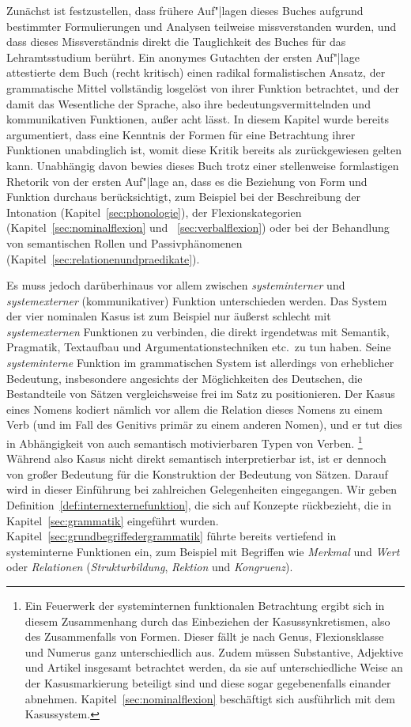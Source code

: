 Zunächst ist festzustellen, dass frühere Auf"|lagen dieses Buches aufgrund bestimmter Formulierungen und Analysen teilweise missverstanden wurden, und dass dieses Missverständnis direkt die Tauglichkeit des Buches für das Lehramtsstudium berührt.
Ein anonymes Gutachten der ersten Auf"|lage attestierte dem Buch (recht kritisch) einen radikal formalistischen Ansatz, der grammatische Mittel vollständig losgelöst von ihrer Funktion betrachtet, und der damit das Wesentliche der Sprache, also ihre bedeutungsvermittelnden und kommunikativen Funktionen, außer acht lässt.
In diesem Kapitel wurde bereits argumentiert, dass eine Kenntnis der Formen für eine Betrachtung ihrer Funktionen unabdinglich ist, womit diese Kritik bereits als zurückgewiesen gelten kann.
Unabhängig davon bewies dieses Buch trotz einer stellenweise formlastigen Rhetorik von der ersten Auf"|lage an, dass es die Beziehung von Form und Funktion durchaus berücksichtigt, zum Beispiel bei der Beschreibung der Intonation (Kapitel~\ref{sec:phonologie}), der Flexionskategorien (Kapitel~\ref{sec:nominalflexion} und ~\ref{sec:verbalflexion}) oder bei der Behandlung von semantischen Rollen und Passivphänomenen (Kapitel~\ref{sec:relationenundpraedikate}).

Es muss jedoch darüberhinaus vor allem zwischen \textit{systeminterner} und \textit{systemexterner} (\zB kommunikativer) Funktion unterschieden werden.
Das System der vier nominalen Kasus ist zum Beispiel nur äußerst schlecht mit \textit{systemexternen} Funktionen zu verbinden, die direkt irgendetwas mit Semantik, Pragmatik, Textaufbau und Argumentationstechniken etc.\ zu tun haben.
Seine \textit{systeminterne} Funktion im grammatischen System ist allerdings von erheblicher Bedeutung, insbesondere angesichts der Möglichkeiten des Deutschen, die Bestandteile von Sätzen vergleichsweise frei im Satz zu positionieren.
Der Kasus eines Nomens kodiert nämlich vor allem die Relation dieses Nomens zu einem Verb (und im Fall des Genitivs primär zu einem anderen Nomen), und er tut dies in Abhängigkeit von auch semantisch motivierbaren Typen von Verben.%
\footnote{Ein Feuerwerk der systeminternen funktionalen Betrachtung ergibt sich in diesem Zusammenhang durch das Einbeziehen der Kasussynkretismen, also des Zusammenfalls von Formen.
Dieser fällt je nach Genus, Flexionsklasse und Numerus ganz unterschiedlich aus.
Zudem müssen Substantive, Adjektive und Artikel insgesamt betrachtet werden, da sie auf unterschiedliche Weise an der Kasusmarkierung beteiligt sind und diese sogar gegebenenfalls einander abnehmen.
Kapitel~\ref{sec:nominalflexion} beschäftigt sich ausführlich mit dem Kasussystem.}
Während also Kasus nicht direkt semantisch interpretierbar ist, ist er dennoch von großer Bedeutung für die Konstruktion der Bedeutung von Sätzen.
Darauf wird in dieser Einführung bei zahlreichen Gelegenheiten eingegangen.
Wir geben Definition~\ref{def:internexternefunktion}, die sich auf Konzepte rückbezieht, die in Kapitel~\ref{sec:grammatik} eingeführt wurden.
Kapitel~\ref{sec:grundbegriffedergrammatik} führte bereits vertiefend in systeminterne Funktionen ein, zum Beispiel mit Begriffen wie \textit{Merkmal} und \textit{Wert} oder \textit{Relationen} (\textit{Strukturbildung}, \textit{Rektion} und \textit{Kongruenz}).

